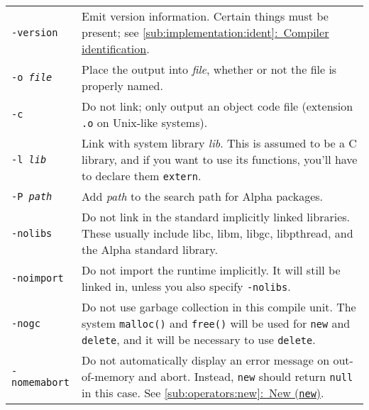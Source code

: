 \documentclass{article}
\newcommand{\textref}[2]{\hyperref[#1]{\underline{\ref*{#1}:~#2}}}
\begin{document}
\begin{center}
\begin{tabular}{|l|p{4in}|}
\hline
\texttt{-version} & Emit version information. Certain things must be present;
  see \textref{sub:implementation:ident}{Compiler identification}. \\
\texttt{-o {\it file}} & Place the output into {\it file}, whether or not
  the file is properly named. \\
\texttt{-c} & Do not link; only output an object code file (extension
  \texttt{.o} on Unix-like systems). \\
\texttt{-l {\it lib}} & Link with system library {\it lib}. This is assumed
  to be a C library, and if you want to use its functions, you'll have to
  declare them \texttt{extern}. \\
\texttt{-P {\it path}} & Add {\it path} to the search path for Alpha
  packages. \\
\texttt{-nolibs} & Do not link in the standard implicitly linked libraries.
  These usually include libc, libm, libgc, libpthread, and the Alpha
  standard library. \\
\texttt{-noimport} & Do not import the runtime implicitly. It will still be
  linked in, unless you also specify \texttt{-nolibs}. \\
\texttt{-nogc} & Do not use garbage collection in this compile unit. The system
  \texttt{malloc()} and \texttt{free()} will be used for \texttt{new} and
  \texttt{delete}, and it will be necessary to use \texttt{delete}. \\
\texttt{-nomemabort} & Do not automatically display an error message on
  out-of-memory and abort. Instead, \texttt{new} should return \texttt{null}
  in this case. See \textref{sub:operators:new}{New (\texttt{new})}. \\
\hline
\end{tabular}
\end{center}
\end{document}
